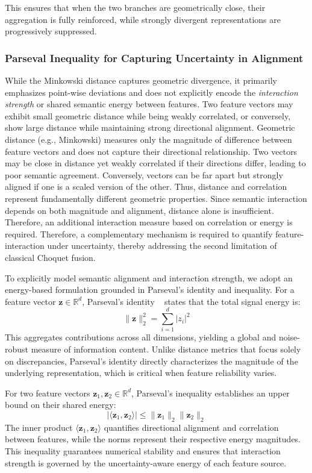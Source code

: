 \documentclass[preprint,12pt]{elsarticle}
\begin{document}
This ensures that when the two branches are geometrically close, their aggregation is fully reinforced, while strongly divergent representations are progressively suppressed.

\subsubsection{Parseval Inequality for Capturing Uncertainty in Alignment}

While the Minkowski distance captures geometric divergence, it primarily emphasizes point-wise deviations and does not explicitly encode the \emph{interaction strength} or shared semantic energy between features. Two feature vectors may exhibit small geometric distance while being weakly correlated, or conversely, show large distance while maintaining strong directional alignment. Geometric distance (e.g., Minkowski) measures only the magnitude of difference between feature vectors and does not capture their directional relationship. Two vectors may be close in distance yet weakly correlated if their directions differ, leading to poor semantic agreement. Conversely, vectors can be far apart but strongly aligned if one is a scaled version of the other. Thus, distance and correlation represent fundamentally different geometric properties. Since semantic interaction depends on both magnitude and alignment, distance alone is insufficient. Therefore, an additional interaction measure based on correlation or energy is required. Therefore, a complementary mechanism is required to quantify feature-interaction under uncertainty, thereby addressing the second limitation of classical Choquet fusion.

To explicitly model semantic alignment and interaction strength, we adopt an energy-based formulation grounded in Parseval's identity and inequality. For a feature vector $\mathbf{z} \in \mathbb{R}^d$, Parseval's identity ~\cite{b11} states that the total signal energy is:
\begin{equation*}
    \|\mathbf{z}\|_2^2 = \sum_{i=1}^{d} |z_i|^2
    \label{eq:parseval_identity}
\end{equation*}
This aggregates contributions across all dimensions, yielding a global and noise-robust measure of information content. Unlike distance metrics that focus solely on discrepancies, Parseval's identity directly characterizes the magnitude of the underlying representation, which is critical when feature reliability varies.

For two feature vectors $\mathbf{z}_1, \mathbf{z}_2 \in \mathbb{R}^d$, Parseval's inequality establishes an upper bound on their shared energy:
\begin{equation*}
    |\langle \mathbf{z}_1, \mathbf{z}_2 \rangle| \leq \|\mathbf{z}_1\|_2 \|\mathbf{z}_2\|_2
    \label{eq:parseval_inequality}
\end{equation*}
The inner product $\langle \mathbf{z}_1, \mathbf{z}_2 \rangle$ quantifies directional alignment and correlation between features, while the norms represent their respective energy magnitudes. This inequality guarantees numerical stability and ensures that interaction strength is governed by the uncertainty-aware energy of each feature source.
\end{document}
